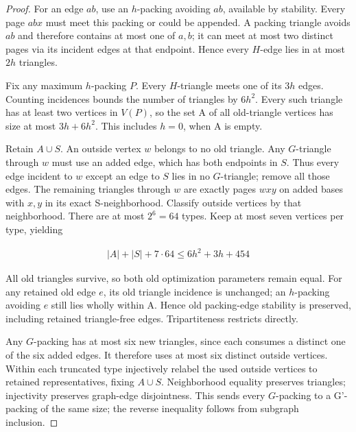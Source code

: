 \documentclass[11pt]{article}
\theoremstyle{definition}\newtheorem{definition}[theorem]{Definition}
\theoremstyle{remark}\newtheorem{remark}[theorem]{Remark}
\begin{document}
\begin{proof}\leavevmode
For an edge \(ab\), use an \(h\)-packing avoiding \(ab\), available by stability. Every page \(abx\) must meet this packing or could be appended. A packing triangle avoids \(ab\) and therefore contains at most one of \(a,b\); it can meet at most two distinct pages via its incident edges at that endpoint. Hence every \(H\)-edge lies in at most \(2h\) triangles.

Fix any maximum \(h\)-packing \(P\). Every \(H\)-triangle meets one of its \(3h\) edges. Counting incidences bounds the number of triangles by \(6h^2\). Every such triangle has at least two vertices in \(V(P)\), so the set A of all old-triangle vertices has size at most \(3h+6h^2\). This includes \(h=0\), when A is empty.

Retain \(A \cup S\). An outside vertex \(w\) belongs to no old triangle. Any \(G\)-triangle through \(w\) must use an added edge, which has both endpoints in \(S\). Thus every edge incident to \(w\) except an edge to \(S\) lies in no \(G\)-triangle; remove all those edges. The remaining triangles through \(w\) are exactly pages \(wxy\) on added bases with \(x,y\) in its exact S-neighborhood. Classify outside vertices by that neighborhood. There are at most \(2^6=64\) types. Keep at most seven vertices per type, yielding

\begin{equation}
\begin{gathered}
|A|+|S|+7\cdot 64 \le  6h^2+3h+454
\end{gathered}
\end{equation}

All old triangles survive, so both old optimization parameters remain equal. For any retained old edge \(e\), its old triangle incidence is unchanged; an \(h\)-packing avoiding \(e\) still lies wholly within A. Hence old packing-edge stability is preserved, including retained triangle-free edges. Tripartiteness restricts directly.

Any \(G\)-packing has at most six new triangles, since each consumes a distinct one of the six added edges. It therefore uses at most six distinct outside vertices. Within each truncated type injectively relabel the used outside vertices to retained representatives, fixing \(A \cup S\). Neighborhood equality preserves triangles; injectivity preserves graph-edge disjointness. This sends every \(G\)-packing to a G'-packing of the same size; the reverse inequality follows from subgraph inclusion.


\end{proof}
\end{document}
